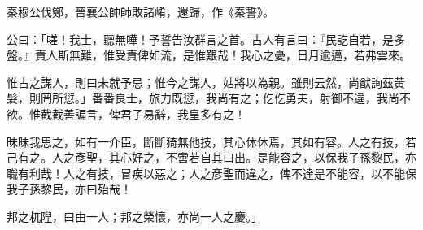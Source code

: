 
\begin{pinyinscope}
秦穆公伐鄭，晉襄公帥師敗諸崤，還歸，作《秦誓》。

公曰：「嗟！我士，聽無嘩！予誓告汝群言之首。古人有言曰：『民訖自若，是多盤。』責人斯無難，惟受責俾如流，是惟艱哉！我心之憂，日月逾邁，若弗雲來。

惟古之謀人，則曰未就予忌；惟今之謀人，姑將以為親。雖則云然，尚猷詢茲黃髮，則罔所愆。」番番良士，旅力既愆，我尚有之；仡仡勇夫，射御不違，我尚不欲。惟截截善諞言，俾君子易辭，我皇多有之！

昧昧我思之，如有一介臣，斷斷猗無他技，其心休休焉，其如有容。人之有技，若己有之。人之彥聖，其心好之，不啻若自其口出。是能容之，以保我子孫黎民，亦職有利哉！人之有技，冒疾以惡之；人之彥聖而違之，俾不達是不能容，以不能保我子孫黎民，亦曰殆哉！

邦之杌隉，曰由一人；邦之榮懷，亦尚一人之慶。」


\end{pinyinscope}